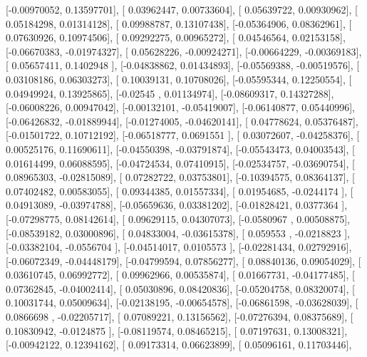 \documentclass{article}
\begin{document}
       [-0.00970052,  0.13597701],
       [ 0.03962447,  0.00733604],
       [ 0.05639722,  0.00930962],
       [ 0.05184298,  0.01314128],
       [ 0.09988787,  0.13107438],
       [-0.05364906,  0.08362961],
       [ 0.07630926,  0.10974506],
       [ 0.09292275,  0.00965272],
       [ 0.04546564,  0.02153158],
       [-0.06670383, -0.01974327],
       [ 0.05628226, -0.00924271],
       [-0.00664229, -0.00369183],
       [ 0.05657411,  0.1402948 ],
       [-0.04838862,  0.01434893],
       [-0.05569388, -0.00519576],
       [ 0.03108186,  0.06303273],
       [ 0.10039131,  0.10708026],
       [-0.05595344,  0.12250554],
       [ 0.04949924,  0.13925865],
       [-0.02545   ,  0.01134974],
       [-0.08609317,  0.14327288],
       [-0.06008226,  0.00947042],
       [-0.00132101, -0.05419007],
       [-0.06140877,  0.05440996],
       [-0.06426832, -0.01889944],
       [-0.01274005, -0.04620141],
       [ 0.04778624,  0.05376487],
       [-0.01501722,  0.10712192],
       [-0.06518777,  0.0691551 ],
       [ 0.03072607, -0.04258376],
       [ 0.00525176,  0.11690611],
       [-0.04550398, -0.03791874],
       [-0.05543473,  0.04003543],
       [ 0.01614499,  0.06088595],
       [-0.04724534,  0.07410915],
       [-0.02534757, -0.03690754],
       [ 0.08965303, -0.02815089],
       [ 0.07282722,  0.03753801],
       [-0.10394575,  0.08364137],
       [ 0.07402482,  0.00583055],
       [ 0.09344385,  0.01557334],
       [ 0.01954685, -0.0244174 ],
       [ 0.04913089, -0.03974788],
       [-0.05659636,  0.03381202],
       [-0.01828421,  0.0377364 ],
       [-0.07298775,  0.08142614],
       [ 0.09629115,  0.04307073],
       [-0.0580967 ,  0.00508875],
       [-0.08539182,  0.03000896],
       [ 0.04833004, -0.03615378],
       [ 0.059553  , -0.0218823 ],
       [-0.03382104, -0.0556704 ],
       [-0.04514017,  0.0105573 ],
       [-0.02281434,  0.02792916],
       [-0.06072349, -0.04448179],
       [-0.04799594,  0.07856277],
       [ 0.08840136,  0.09054029],
       [ 0.03610745,  0.06992772],
       [ 0.09962966,  0.00535874],
       [ 0.01667731, -0.04177485],
       [ 0.07362845, -0.04002414],
       [ 0.05030896,  0.08420836],
       [-0.05204758,  0.08320074],
       [ 0.10031744,  0.05009634],
       [-0.02138195, -0.00654578],
       [-0.06861598, -0.03628039],
       [ 0.0866698 , -0.02205717],
       [ 0.07089221,  0.13156562],
       [-0.07276394,  0.08375689],
       [ 0.10830942, -0.0124875 ],
       [-0.08119574,  0.08465215],
       [ 0.07197631,  0.13008321],
       [-0.00942122,  0.12394162],
       [ 0.09173314,  0.06623899],
       [ 0.05096161,  0.11703446],
\end{document}
